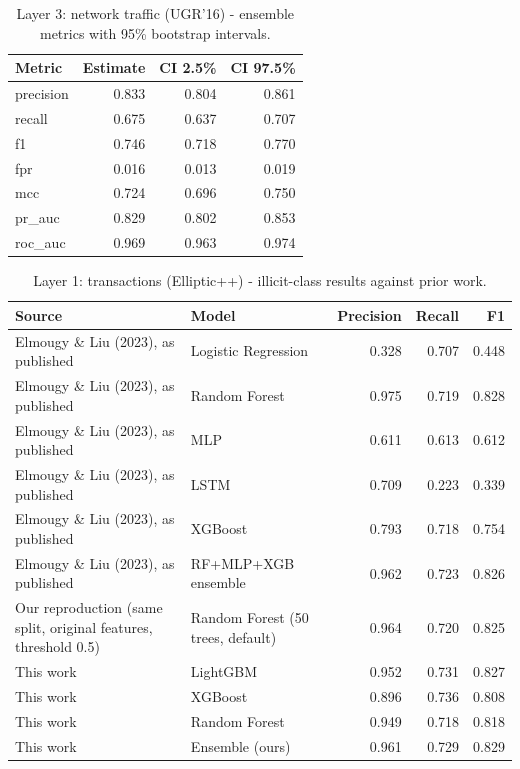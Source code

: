 \begin{table}[t]
\centering
\caption{Layer 3: network traffic (UGR'16) - ensemble metrics with 95\% bootstrap intervals.}
\label{tab:network-ci}
\begin{tabular}{lrrr}
\toprule
Metric & Estimate & CI 2.5\% & CI 97.5\% \\
\midrule
precision & 0.833 & 0.804 & 0.861 \\
recall & 0.675 & 0.637 & 0.707 \\
f1 & 0.746 & 0.718 & 0.770 \\
fpr & 0.016 & 0.013 & 0.019 \\
mcc & 0.724 & 0.696 & 0.750 \\
pr\_auc & 0.829 & 0.802 & 0.853 \\
roc\_auc & 0.969 & 0.963 & 0.974 \\
\bottomrule
\end{tabular}
\end{table}

\begin{table}[t]
\centering
\caption{Layer 1: transactions (Elliptic++) - illicit-class results against prior work.}
\label{tab:transaction-literature}
\begin{tabular}{llrrr}
\toprule
Source & Model & Precision & Recall & F1 \\
\midrule
Elmougy \& Liu (2023), as published & Logistic Regression & 0.328 & 0.707 & 0.448 \\
Elmougy \& Liu (2023), as published & Random Forest & 0.975 & 0.719 & 0.828 \\
Elmougy \& Liu (2023), as published & MLP & 0.611 & 0.613 & 0.612 \\
Elmougy \& Liu (2023), as published & LSTM & 0.709 & 0.223 & 0.339 \\
Elmougy \& Liu (2023), as published & XGBoost & 0.793 & 0.718 & 0.754 \\
Elmougy \& Liu (2023), as published & RF+MLP+XGB ensemble & 0.962 & 0.723 & 0.826 \\
Our reproduction (same split, original features, threshold 0.5) & Random Forest (50 trees, default) & 0.964 & 0.720 & 0.825 \\
This work & LightGBM & 0.952 & 0.731 & 0.827 \\
This work & XGBoost & 0.896 & 0.736 & 0.808 \\
This work & Random Forest & 0.949 & 0.718 & 0.818 \\
This work & Ensemble (ours) & 0.961 & 0.729 & 0.829 \\
\bottomrule
\end{tabular}
\end{table}

